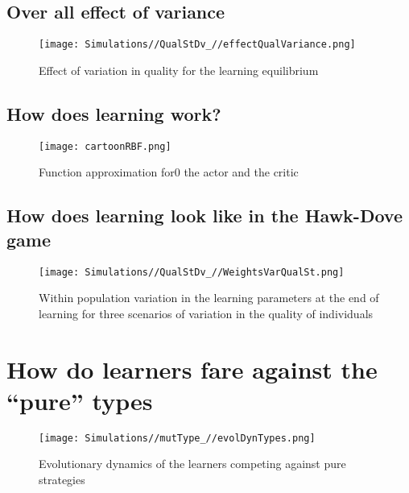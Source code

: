\documentclass[]{article}
\begin{document}
\hypertarget{over-all-effect-of-variance}{%
\subsection{Over all effect of
variance}\label{over-all-effect-of-variance}}

\begin{figure}
\centering
\texttt{[image: Simulations//QualStDv\_//effectQualVariance.png]}
\caption{Effect of variation in quality for the learning equilibrium}
\end{figure}

\hypertarget{how-does-learning-work}{%
\subsection{How does learning work?}\label{how-does-learning-work}}

\begin{figure}
\centering
\texttt{[image: cartoonRBF.png]}
\caption{Function approximation for0 the actor and the critic}
\end{figure}

\hypertarget{how-does-learning-look-like-in-the-hawk-dove-game}{%
\subsection{How does learning look like in the Hawk-Dove
game}\label{how-does-learning-look-like-in-the-hawk-dove-game}}

\begin{figure}
\centering
\texttt{[image: Simulations//QualStDv\_//WeightsVarQualSt.png]}
\caption{Within population variation in the learning parameters at the
end of learning for three scenarios of variation in the quality of
individuals}
\end{figure}

\hypertarget{how-do-learners-fare-against-the-pure-types}{%
\section{How do learners fare against the ``pure''
types}\label{how-do-learners-fare-against-the-pure-types}}

\begin{figure}
\centering
\texttt{[image: Simulations//mutType\_//evolDynTypes.png]}
\caption{Evolutionary dynamics of the learners competing against pure
strategies}
\end{figure}
\end{document}
